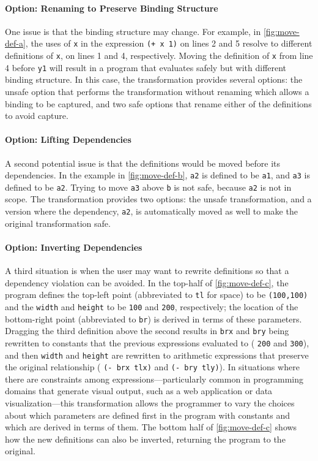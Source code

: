 


\paragraph{Option: Renaming to Preserve Binding Structure}

One issue is that the binding structure may change. For example, in
\autoref{fig:move-def-a}, the uses of \verb+x+ in the expression
\verb&(+ x 1)& on lines 2 and 5 resolve to different definitions of
\verb+x+, on lines 1 and 4, respectively. Moving the definition of
\verb+x+ from line 4 before \verb+y1+ will result in a program that
evaluates safely but with different binding structure.  In this case,
the  transformation provides several options:
the unsafe option that performs the transformation without renaming
which allows a binding to be captured, and two safe options that
rename either of the definitions to avoid capture.


\paragraph{Option: Lifting Dependencies}

A second potential issue is that the definitions would be moved before
its dependencies. In the example in \autoref{fig:move-def-b},
\verb+a2+ is defined to be \verb+a1+, and \verb+a3+ is defined to be
\verb+a2+. Trying to move \verb+a3+ above \verb+b+ is not safe,
because \verb+a2+ is not in scope. The transformation provides two
options: the unsafe transformation, and
a version where the dependency, \verb+a2+, is automatically
moved as well to make the original transformation safe.


\paragraph{Option: Inverting Dependencies}

A third situation is when the user may want to rewrite definitions so
that a dependency violation can be avoided. In the top-half of
\autoref{fig:move-def-c}, the program defines the top-left point
(abbreviated to \verb+tl+ for space) to be \verb+(100,100)+ and the
\verb+width+ and \verb+height+ to be \verb+100+ and \verb+200+,
respectively; the location of the bottom-right point (abbreviated to
\verb+br+) is derived in terms of these parameters. Dragging the
third definition above the second results in \verb+brx+ and \verb+bry+
being rewritten to constants that the previous expressions evaluated
to (\ie{} \verb+200+ and \verb+300+),
and then \verb+width+ and \verb+height+ are rewritten to arithmetic
expressions that preserve the original relationship
(\ie{} \verb&(- brx tlx)& and \verb&(- bry tly)&). In situations
where there are constraints among expressions---particularly common in
programming domains that generate visual output, such as
a web application or data visualization---this transformation
allows the programmer to vary the choices about which parameters are
defined first in the program with constants and which are derived
in terms of them. The bottom half
of \autoref{fig:move-def-c} shows how the new definitions
can also be inverted, returning the program to the original.


